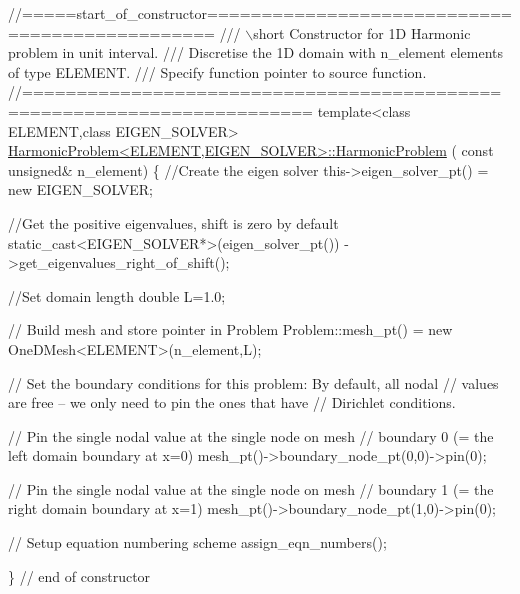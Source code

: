  
\begin{DoxyCodeInclude}
\textcolor{comment}{//=====start\_of\_constructor===============================================}
\textcolor{comment}{/// \(\backslash\)short Constructor for 1D Harmonic problem in unit interval.}
\textcolor{comment}{}\textcolor{comment}{/// Discretise the 1D domain with n\_element elements of type ELEMENT.}
\textcolor{comment}{}\textcolor{comment}{/// Specify function pointer to source function. }
\textcolor{comment}{}\textcolor{comment}{//========================================================================}
\textcolor{keyword}{template}<\textcolor{keyword}{class} ELEMENT,\textcolor{keyword}{class} EIGEN\_SOLVER>
\hyperlink{classHarmonicProblem_a77a25847f00ae50c83218530149e3e57}{HarmonicProblem<ELEMENT,EIGEN\_SOLVER>::HarmonicProblem}
      (
 \textcolor{keyword}{const} \textcolor{keywordtype}{unsigned}& n\_element)
\{ 
 \textcolor{comment}{//Create the eigen solver}
 this->eigen\_solver\_pt() = \textcolor{keyword}{new} EIGEN\_SOLVER;
 
 \textcolor{comment}{//Get the positive eigenvalues, shift is zero by default}
 \textcolor{keyword}{static\_cast<}EIGEN\_SOLVER*\textcolor{keyword}{>}(eigen\_solver\_pt())
  ->get\_eigenvalues\_right\_of\_shift(); 

 \textcolor{comment}{//Set domain length }
 \textcolor{keywordtype}{double} L=1.0;

 \textcolor{comment}{// Build mesh and store pointer in Problem}
 Problem::mesh\_pt() = \textcolor{keyword}{new} OneDMesh<ELEMENT>(n\_element,L);
 
 \textcolor{comment}{// Set the boundary conditions for this problem: By default, all nodal}
 \textcolor{comment}{// values are free -- we only need to pin the ones that have }
 \textcolor{comment}{// Dirichlet conditions. }

 \textcolor{comment}{// Pin the single nodal value at the single node on mesh }
 \textcolor{comment}{// boundary 0 (= the left domain boundary at x=0)}
 mesh\_pt()->boundary\_node\_pt(0,0)->pin(0);
 
 \textcolor{comment}{// Pin the single nodal value at the single node on mesh }
 \textcolor{comment}{// boundary 1 (= the right domain boundary at x=1)}
 mesh\_pt()->boundary\_node\_pt(1,0)->pin(0);
 
 \textcolor{comment}{// Setup equation numbering scheme}
 assign\_eqn\_numbers();

\} \textcolor{comment}{// end of constructor}

\end{DoxyCodeInclude}




